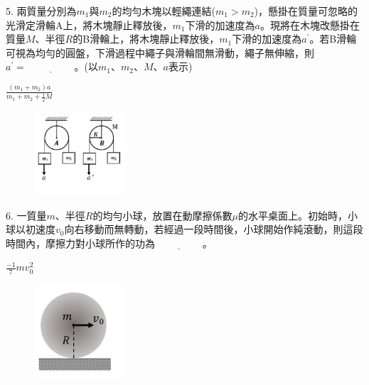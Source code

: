 \documentclass[cn,10pt,math=newtx,chinesefont=founder,device=ig]{elegantbook}
\begin{document}
\begin{example}
   5. 兩質量分別為$m_1與m_2$的均勻木塊以輕繩連結($m_1>m_2$)，懸掛在質量可忽略的光滑定滑輪A上，將木塊靜止釋放後，$m_1$下滑的加速度為$a$。現將在木塊改懸掛在質量$M$、半徑$R$的B滑輪上，將木塊靜止釋放後，$m_1$下滑的加速度為$a^{'}$。若B滑輪可視為均勻的圓盤，下滑過程中繩子與滑輪間無滑動，繩子無伸縮，則$a^{'}=\underline{\hspace{2cm}}$。(以$m_1、m_2、M、a$表示)\\
    \rightline{[桃園高中教甄109]}
\end{example}
\begin{solution}
    $\frac{(m_1+m_2) a} {m_1+m_2+ \frac{1}{2} M}$
\end{solution}
\begin{figure}[htbp]
    \flushright
    \includegraphics[width=0.3\textwidth]{image/109桃園5.png}
  \end{figure}
\newpage

\begin{example}
   6. 一質量$m$、半徑$R$的均勻小球，放置在動摩擦係數$\mu$的水平桌面上。初始時，小球以初速度$v_0$向右移動而無轉動，若經過一段時間後，小球開始作純滾動，則這段時間內，摩擦力對小球所作的功為$\underline{\hspace{2cm}}$。\\
    \rightline{[桃園高中教甄109]}
\end{example}
\begin{solution}
    $\frac{-1}{7} m v_0 ^2$
\end{solution}
\begin{figure}[htbp]
    \flushright
    \includegraphics[width=0.3\textwidth]{image/109桃園6.png}
  \end{figure}
\newpage
\end{document}
